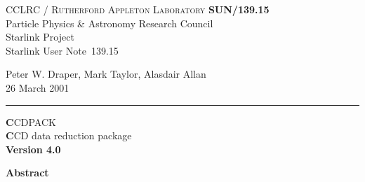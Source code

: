 \documentclass[twoside,11pt]{article}
\newcommand{\stardoccategory}  {Starlink User Note}
\newcommand{\stardocinitials}  {SUN}
\newcommand{\stardocnumber}    {139.15}
\newcommand{\stardocauthors}   {Peter W. Draper, Mark Taylor, Alasdair Allan}
\newcommand{\stardocdate}      {26 March 2001}
\newcommand{\stardoctitle}     {CCDPACK}
\newcommand{\stardoconeline}   {CCD data reduction package}
\newcommand{\stardocversion}   {Version 4.0}
\newcommand{\stardocname}{\stardocinitials /\stardocnumber}
\newenvironment{latexonly}{}{}
\renewcommand{\_}{\texttt{\symbol{95}}}
\begin{document}
\thispagestyle{empty}

\begin{latexonly}
   CCLRC / \textsc{Rutherford Appleton Laboratory} \hfill \textbf{\stardocname}\\
   {\large Particle Physics \& Astronomy Research Council}\\
   {\large Starlink Project\\}
   {\large \stardoccategory\ \stardocnumber}
   \begin{flushright}
   \stardocauthors\\
   \stardocdate
   \end{flushright}
   \vspace{-4mm}
   \rule{\textwidth}{0.5mm}
   \vspace{5mm}
   \begin{center}
   {\Huge\textbf  \stardoctitle \\ [2.5ex]}
   {\LARGE\textbf \stardoconeline \\ [4ex]}
   {\large \bf \stardocversion}
   \end{center}
   \vspace{5mm}


   \vspace{10mm}
   \begin{center}
      {\Large\textbf{Abstract}}
   \end{center}
\end{latexonly}
\end{document}
